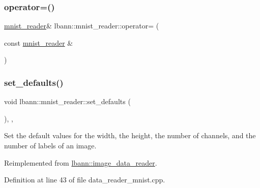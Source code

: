 \subsubsection{\texorpdfstring{operator=()}{operator=()}}
{\footnotesize\ttfamily \hyperlink{classlbann_1_1mnist__reader}{mnist\+\_\+reader}\& lbann\+::mnist\+\_\+reader\+::operator= (\begin{DoxyParamCaption}\item[{const \hyperlink{classlbann_1_1mnist__reader}{mnist\+\_\+reader} \&}]{ }\end{DoxyParamCaption})\hspace{0.3cm}{\ttfamily [default]}}

\mbox{\label{classlbann_1_1mnist__reader_a5b9a3d56e2d1e1c6820b3c7cc8cde17d}} 
\subsubsection{\texorpdfstring{set\+\_\+defaults()}{set\_defaults()}}
{\footnotesize\ttfamily void lbann\+::mnist\+\_\+reader\+::set\+\_\+defaults (\begin{DoxyParamCaption}{ }\end{DoxyParamCaption})\hspace{0.3cm}{\ttfamily [override]}, {\ttfamily [protected]}, {\ttfamily [virtual]}}



Set the default values for the width, the height, the number of channels, and the number of labels of an image. 



Reimplemented from \hyperlink{classlbann_1_1image__data__reader_a8e9dbeaa0239d56597455cc23787a21d}{lbann\+::image\+\_\+data\+\_\+reader}.



Definition at line 43 of file data\+\_\+reader\+\_\+mnist.\+cpp.


